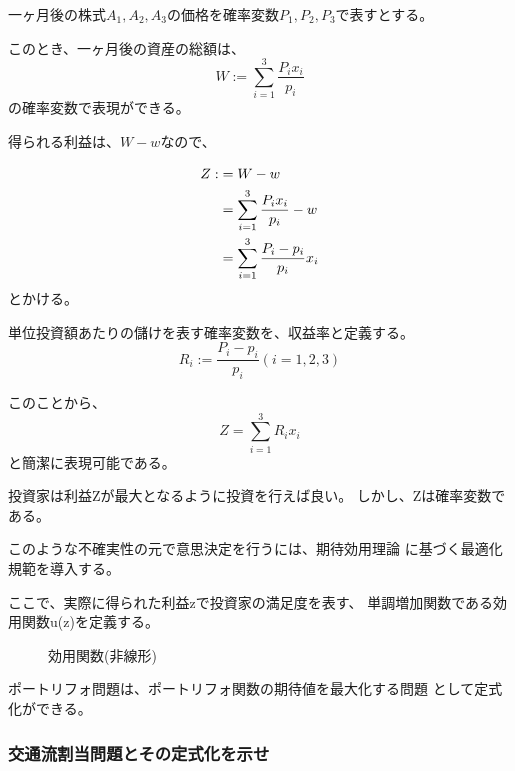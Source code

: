 \documentclass[9pt]{ltjsreport}
\begin{document}
一ヶ月後の株式$A_1,A_2,A_3$の価格を確率変数$P_1,P_2,P_3$で表すとする。

このとき、一ヶ月後の資産の総額は、
\begin{equation}
    W:=\sum_{i=1}^3 \frac{P_ix_i}{p_i}
\end{equation}
の確率変数で表現ができる。

得られる利益は、$W-w$なので、

\begin{align}
    Z : & = W-w \notag \\
      & = \sum_{i=1}^3 \frac{P_ix_i}{p_i} - w \notag \\
      & = \sum_{i=1}^3 \frac{P_i - p_i}{p_i} x_i
\end{align}
とかける。

\begin{tcolorbox}[title=収益率の定義]
単位投資額あたりの儲けを表す確率変数を、収益率と定義する。
\begin{equation}
    R_i := \frac{P_i-p_i}{p_i} (i=1,2,3)
\end{equation}
\end{tcolorbox}

このことから、
\begin{equation}
    Z=\sum_{i=1}^3 R_ix_i
\end{equation}
と簡潔に表現可能である。


投資家は利益Zが最大となるように投資を行えば良い。
しかし、Zは確率変数である。

このような不確実性の元で意思決定を行うには、期待効用理論
に基づく最適化規範を導入する。

ここで、実際に得られた利益zで投資家の満足度を表す、
単調増加関数である効用関数u(z)を定義する。

\begin{figure}[h]
    \caption{効用関数(非線形)}
    \label{fig:satisfaction}
\begin{center}
\end{center}
\end{figure}

ポートリフォ問題は、ポートリフォ関数の期待値を最大化する問題
として定式化ができる。

\newpage
\subsubsection{交通流割当問題とその定式化を示せ}
\end{document}
